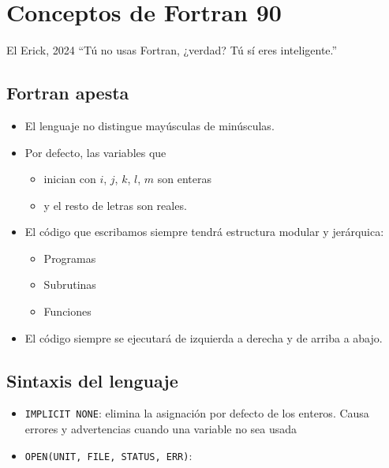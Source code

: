 \chapter{Conceptos de Fortran 90}

\begin{chapquote}{El Erick, 2024}
    ``Tú no usas Fortran, ¿verdad? Tú sí eres inteligente.''
\end{chapquote}

\section{Fortran apesta}

\begin{itemize}
	\item{El lenguaje no distingue mayúsculas de minúsculas.}
	\item{Por defecto, las variables que
			\begin{itemize}
				\item{inician con $i$, $j$, $k$, $l$, $m$ son enteras}
				\item{y el resto de letras son reales.}
			\end{itemize}
		}
	\item{El código que escribamos siempre tendrá estructura modular y
			jerárquica:
			\begin{itemize}
				\item{Programas}
				\item{Subrutinas}
				\item{Funciones}
			\end{itemize}
		}
	\item{El código siempre se ejecutará de izquierda a derecha y de arriba
		a abajo.}
\end{itemize}

\section{Sintaxis del lenguaje}

\begin{itemize}
	\item{\texttt{IMPLICIT NONE}: elimina la asignación por defecto de los enteros. Causa errores y advertencias cuando una variable no sea usada}
	\item{\texttt{OPEN(UNIT, FILE, STATUS, ERR)}: }
\end{itemize}

